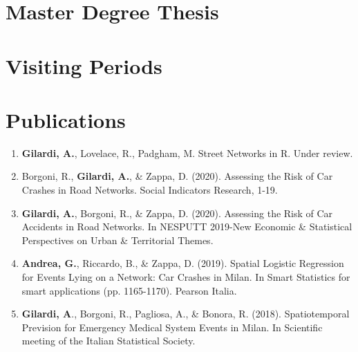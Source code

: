 \documentclass[11pt,a4paper,sans]{moderncv}
\begin{document}
	\section{Master Degree Thesis}
	
	\section{Visiting Periods}
	
	\section{Publications}
	\begin{enumerate}
		\item \textbf{Gilardi, A.}, Lovelace, R., Padgham, M. Street Networks in R. Under review. 
		\item Borgoni, R., \textbf{Gilardi, A.}, \& Zappa, D. (2020). Assessing the Risk of Car Crashes in Road Networks. Social Indicators Research, 1-19.
		\item \textbf{Gilardi, A.}, Borgoni, R., \& Zappa, D. (2020). Assessing the Risk of Car Accidents in Road Networks. In NESPUTT 2019-New Economic \& Statistical Perspectives on Urban \& Territorial Themes.
		\item \textbf{Andrea, G.}, Riccardo, B., \& Zappa, D. (2019). Spatial Logistic Regression for Events Lying on a Network: Car Crashes in Milan. In Smart Statistics for smart applications (pp. 1165-1170). Pearson Italia.
		\item \textbf{Gilardi, A}., Borgoni, R., Pagliosa, A., \& Bonora, R. (2018). Spatiotemporal Prevision for Emergency Medical System Events in Milan. In Scientific meeting of the Italian Statistical Society.
	\end{enumerate}
\end{document}
